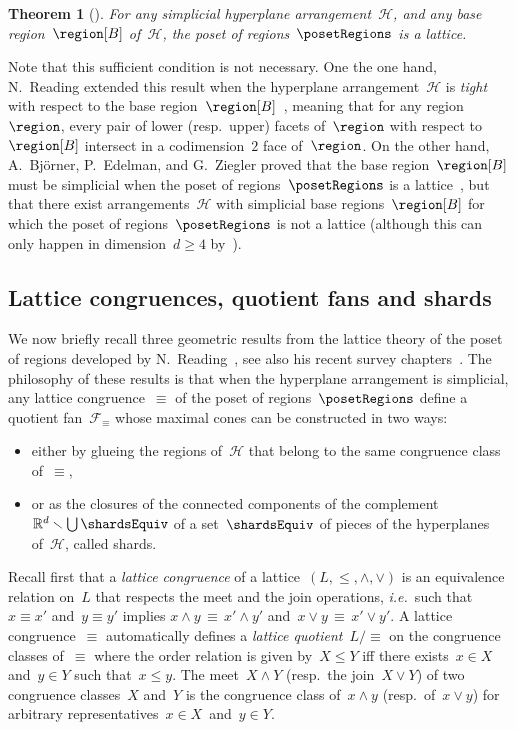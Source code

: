 \documentclass{amsart}
\newtheorem{theorem}{Theorem}%
\theoremstyle{definition}
\newcommand{\R}{\mathbb{R}} %
\newcommand{\ssm}{\smallsetminus} %
\newcommand{\ie}{\textit{i.e.}~} %
\newcommand{\darkblue}{\color{darkblue}} %
\newcommand{\defn}[1]{\textsl{\darkblue #1}} %
\newcommand{\meet}{\wedge} %
\newcommand{\join}{\vee} %
\newcommand{\arrangement}{\mathcal{H}} %
\newcommand{\fanEquiv}{\mathcal{F}_\equiv} %
\begin{document}
\begin{theorem}[{\cite[Thm.~3.4]{BjornerEdelmanZiegler}}]
For any simplicial hyperplane arrangement~$\arrangement$, and any base region~$\region[B]$ of~$\arrangement$, the poset of regions~$\posetRegions$ is a lattice.
\end{theorem}

Note that this sufficient condition is not necessary.
One the one hand, N.~Reading extended this result when the hyperplane arrangement~$\arrangement$ is \defn{tight} with respect to the base region~$\region[B]$~\cite[Thm.~9.3.2]{Reading-PosetRegionsChapter}, meaning that for any region~$\region$, every pair of lower (resp.~upper) facets of~$\region$ with respect to~$\region[B]$ intersect in a codimension~$2$ face of~$\region$.
On the other hand, A.~Bj\"orner, P.~Edelman, and G.~Ziegler proved that the base region~$\region[B]$ must be simplicial when the poset of regions~$\posetRegions$ is a lattice~\cite[Thm.~3.1]{BjornerEdelmanZiegler}, but that there exist arrangements~$\arrangement$ with simplicial base regions~$\region[B]$ for which the poset of regions~$\posetRegions$ is not a lattice (although this can only happen in dimension~${d \ge 4}$ by~\cite[Thm.~3.2]{BjornerEdelmanZiegler}).

\subsection{Lattice congruences, quotient fans and shards}
\label{subsec:latticeQuotients}

We now briefly recall three geometric results from the lattice theory of the poset of regions developed by N.~Reading~\cite{Reading-posetRegions}, see also his recent survey chapters~\cite{Reading-PosetRegionsChapter}.
The philosophy of these results is that when the hyperplane arrangement is simplicial, any lattice congruence~$\equiv$ of the poset of regions~$\posetRegions$ define a quotient fan~$\fanEquiv$ whose maximal cones can be constructed in two ways:
\begin{itemize}
\item either by glueing the regions of~$\arrangement$ that belong to the same congruence class of~$\equiv$,
\item or as the closures of the connected components of the complement~$\R^d \ssm \bigcup \shardsEquiv$ of a set~$\shardsEquiv$ of pieces of the hyperplanes of~$\arrangement$, called shards.
\end{itemize}

Recall first that a \defn{lattice congruence} of a lattice~$(L,\le,\meet,\join)$ is an equivalence relation on~$L$ that respects the meet and the join operations, \ie such that $x \equiv x'$ and~$y \equiv y'$ implies $x \meet y \, \equiv \, x' \meet y'$ and~$x \join y \, \equiv \, x' \join y'$.
A lattice congruence~$\equiv$ automatically defines a \defn{lattice quotient}~$L/{\equiv}$ on the congruence classes of~$\equiv$ where the order relation is given by~$X \le Y$ iff there exists~$x \in X$ and~$y \in Y$ such that~$x \le y$.
The meet~$X \meet Y$ (resp.~the join~$X \join Y$) of two congruence classes~$X$ and~$Y$ is the congruence class of~$x \meet y$ (resp.~of~$x \join y$) for arbitrary representatives~$x \in X$~and~$y \in Y$.
\end{document}
